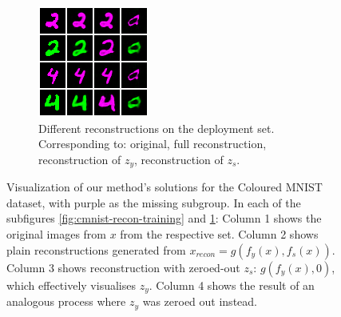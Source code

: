 \begin{figure}[tb]
\begin{subfigure}[b]{0.39\textwidth}
    \includegraphics[width=\textwidth]{example_images/fresh-dawn-2179_context_reconstructions_9900.png}
    \caption{
    Different reconstructions on the deployment set.
    Corresponding to: original, full reconstruction, reconstruction of $z_y$, reconstruction of $z_s$.
    }%
    \label{fig:cmnist-recon-deployment}
  \end{subfigure}
  \caption{
   Visualization of our method's solutions for the Coloured MNIST dataset, with {\color{purple}purple} as the missing subgroup.
   In each of the subfigures \ref{fig:cmnist-recon-training} and \ref{fig:cmnist-recon-deployment}:
   Column 1 shows the original images from $x$ from the respective set.
   Column 2 shows plain reconstructions generated from $x_\textit{recon}=g(f_y(x), f_s(x))$.
   Column 3 shows reconstruction with zeroed-out $z_s$: $g(f_y(x), 0)$, which effectively visualises $z_y$.
   Column 4 shows the result of an analogous process where $z_y$ was zeroed out instead.
  }%
  \label{fig:cmnist-recon}
\end{figure}

